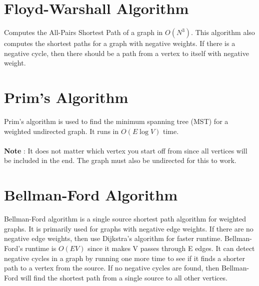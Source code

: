     
	
	\section{Floyd-Warshall Algorithm}
	
	Computes the All-Pairs Shortest Path of a graph in $O(N^3)$. This algorithm 
	also computes the shortest paths for a graph with negative weights. If there 
	is a negative cycle, then there should be a path from a vertex to itself 
	with negative weight.
	
	
	
	\section{Prim's Algorithm}
	
	Prim's algorithm is used to find the minimum spanning tree (MST) for a 
	weighted undirected graph. It runs in $O(E\log{V})$ time.\\
	\ \\
    {\bf Note} : It does not matter which vertex you start off from since all vertices 
    will be included in the end. The graph must also be undirected for this to 
    work.\\
    
    
	
	\section{Bellman-Ford Algorithm}
	
	Bellman-Ford algorithm is a single source shortest path algorithm for 
	weighted graphs. It is primarily used for graphs with negative edge weights. 
	If there are no negative edge weights, then use Dijkstra's algorithm for 
	faster runtime. Bellman-Ford's runtime is $O(EV)$ since it makes V passes 
	through E edges. It can detect negative cycles in a graph by running one 
	more time to see if it finds a shorter path to a vertex from the source. If 
	no negative cycles are found, then Bellman-Ford will find the shortest path 
	from a single source to all other vertices.
 
